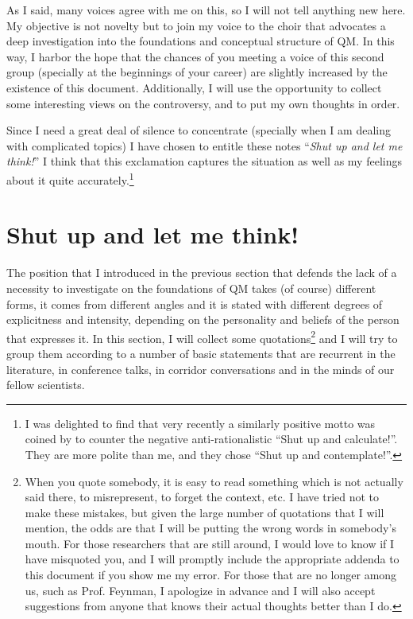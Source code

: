 \documentclass[12pt]{article}
\begin{document}
As I said, many voices agree with me on this, so I will not tell anything new
here. My objective is not novelty but to join my voice to the choir that
advocates a deep investigation into the foundations and conceptual structure
of QM. In this way, I harbor the hope that the chances of you meeting a voice
of this second group (specially at the beginnings of your career) are slightly
increased by the existence of this document. Additionally, I will use the
opportunity to collect some interesting views on the controversy, and to put
my own thoughts in order.

Since I need a great deal of silence to concentrate (specially when I am
dealing with complicated topics) I have chosen to entitle these notes
``\emph{Shut up and let me think!}'' I think that this exclamation captures
the situation as well as my feelings about it quite
accurately.\footnote{\label{foot:contemplate} I was delighted to find that
very recently a similarly positive motto was coined by \cite{Hardy2010} to
counter the negative anti-rationalistic ``Shut up and calculate!''. They are
more polite than me, and they chose ``Shut up and contemplate!''.}


\section{Shut up and let me think!}
\label{sec:shut_up}

The position that I introduced in the previous section that defends the lack
of a necessity to investigate on the foundations of QM takes (of course)
different forms, it comes from different angles and it is stated with
different degrees of explicitness and intensity, depending on the personality
and beliefs of the person that expresses it. In this section, I will collect
some quotations\footnote{\label{foot:quotations} When you quote somebody, it
is easy to read something which is not actually said there, to misrepresent,
to forget the context, etc. I have tried not to make these mistakes, but given
the large number of quotations that I will mention, the odds are that I will
be putting the wrong words in somebody's mouth. For those researchers that are
still around, I would love to know if I have misquoted you, and I will
promptly include the appropriate addenda to this document if you show me my
error. For those that are no longer among us, such as Prof. Feynman, I
apologize in advance and I will also accept suggestions from anyone that knows
their actual thoughts better than I do.} and I will try to group them
according to a number of basic statements that are recurrent in the
literature, in conference talks, in corridor conversations and in the minds of
our fellow scientists.
\end{document}
